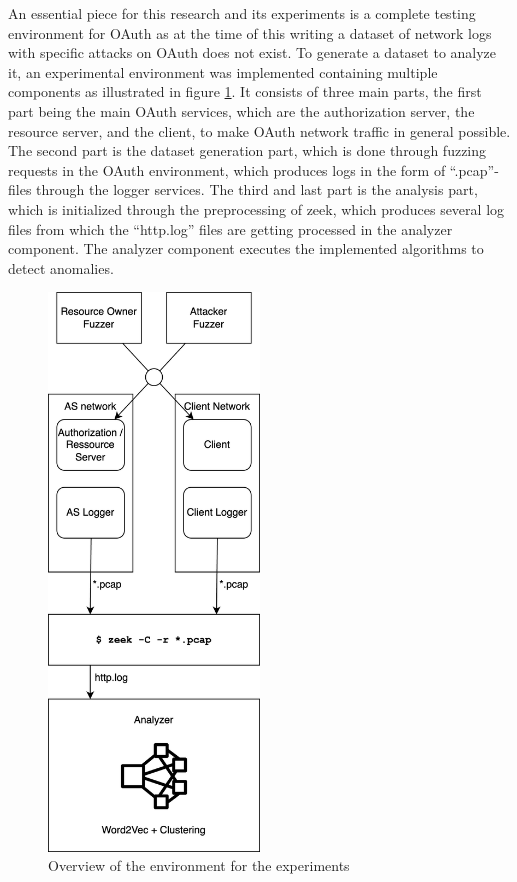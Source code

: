 \documentclass[
    fontsize=12pt,
    headings=small,
    parskip=half,           %
    bibliography=totoc,
    numbers=noenddot,       %
    open=any,               %
    ]{scrreprt}
\begin{document}
An essential piece for this research and its experiments is a complete testing environment for OAuth as at the time of this writing a dataset of network logs with specific attacks on OAuth does not exist. To generate a dataset to analyze it, an experimental environment was implemented containing multiple components as illustrated in figure \ref{fig:experimental_setup}. It consists of three main parts, the first part being the main OAuth services, which are the authorization server, the resource server, and the client, to make OAuth network traffic in general possible. The second part is the dataset generation part, which is done through fuzzing requests in the OAuth environment, which produces logs in the form of ``.pcap''-files through the logger services. The third and last part is the analysis part, which is initialized through the preprocessing of zeek, which produces several log files from which the ``http.log'' files are getting processed in the analyzer component. The analyzer component executes the implemented algorithms to detect anomalies.

\begin{figure}[H]
	\sffamily\footnotesize
	\includegraphics[width=0.5\textwidth]{pic/experimental_setup.png}
	\unitlength=0.75mm
	\linethickness{0.4pt}
	\caption{Overview of the environment for the experiments}
	\label{fig:experimental_setup}
\end{figure}
\end{document}
